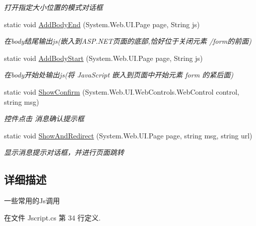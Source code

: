\begin{DoxyCompactItemize}
\begin{DoxyCompactList}\small\item\em 打开指定大小位置的模式对话框 \end{DoxyCompactList}\item 
static void \hyperlink{class_x_c_l_net_tools_1_1_javascript_1_1_jscript_a3dcdf2894a7187508492083b6743abe1}{Add\-Body\-End} (System.\-Web.\-U\-I.\-Page page, String js)
\begin{DoxyCompactList}\small\item\em 在body结尾输出js(嵌入到\-A\-S\-P.\-N\-E\-T页面的底部,恰好位于关闭元素 /form的前面) \end{DoxyCompactList}\item 
static void \hyperlink{class_x_c_l_net_tools_1_1_javascript_1_1_jscript_ab8e14181b9b1e9f12462ef20f49d69ee}{Add\-Body\-Start} (System.\-Web.\-U\-I.\-Page page, String js)
\begin{DoxyCompactList}\small\item\em 在body开始处输出js(将 Java\-Script 嵌入到页面中开始元素 form 的紧后面) \end{DoxyCompactList}\item 
static void \hyperlink{class_x_c_l_net_tools_1_1_javascript_1_1_jscript_a94e45aa47def3164202b40ff0405f922}{Show\-Confirm} (System.\-Web.\-U\-I.\-Web\-Controls.\-Web\-Control control, string msg)
\begin{DoxyCompactList}\small\item\em 控件点击 消息确认提示框 \end{DoxyCompactList}\item 
static void \hyperlink{class_x_c_l_net_tools_1_1_javascript_1_1_jscript_ade747fd49c7e14dae3652e014a6255d9}{Show\-And\-Redirect} (System.\-Web.\-U\-I.\-Page page, string msg, string url)
\begin{DoxyCompactList}\small\item\em 显示消息提示对话框，并进行页面跳转 \end{DoxyCompactList}\end{DoxyCompactItemize}


\subsection{详细描述}
一些常用的\-Js调用 



在文件 Jscript.\-cs 第 34 行定义.



